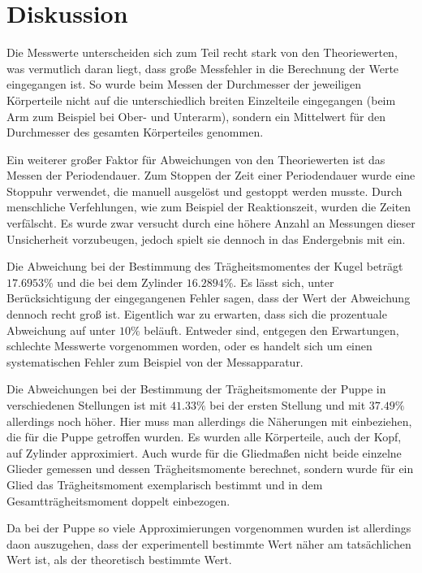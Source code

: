 \newpage
\section{Diskussion}
\label{sec:Diskussion}


Die Messwerte unterscheiden sich zum Teil recht stark von den Theoriewerten, was vermutlich daran liegt, dass große Messfehler
in die Berechnung der Werte eingegangen ist. So wurde beim Messen der Durchmesser der jeweiligen Körperteile nicht auf die unterschiedlich
breiten Einzelteile eingegangen (beim Arm zum Beispiel bei Ober- und Unterarm), sondern ein Mittelwert für den Durchmesser des gesamten
Körperteiles genommen.

Ein weiterer großer Faktor für Abweichungen von den Theoriewerten ist das Messen der Periodendauer. Zum Stoppen der Zeit einer 
Periodendauer wurde eine Stoppuhr verwendet, die manuell ausgelöst und gestoppt werden musste. Durch menschliche Verfehlungen, wie zum Beispiel
der Reaktionszeit, wurden die Zeiten verfälscht. Es wurde zwar versucht durch eine höhere Anzahl an Messungen dieser Unsicherheit vorzubeugen, jedoch
spielt sie dennoch in das Endergebnis mit ein. 

Die Abweichung bei der Bestimmung des Trägheitsmomentes der Kugel beträgt $17.6953 \%$ und die bei dem Zylinder $16.2894 \%$. Es lässt sich,
unter Berücksichtigung der eingegangenen Fehler sagen, dass der Wert der Abweichung dennoch recht groß ist. Eigentlich war zu erwarten, dass sich die
prozentuale Abweichung auf unter $10 \%$ beläuft. Entweder sind, entgegen den Erwartungen, schlechte Messwerte vorgenommen worden, oder es handelt
sich um einen systematischen Fehler zum Beispiel von der Messapparatur.

Die Abweichungen bei der Bestimmung der Trägheitsmomente der Puppe in verschiedenen Stellungen ist mit $41.33 \%$ bei der ersten Stellung und mit
$37.49 \%$ allerdings noch höher. Hier muss man allerdings die Näherungen mit einbeziehen, die für die Puppe getroffen wurden. Es wurden alle
Körperteile, auch der Kopf, auf Zylinder approximiert. Auch wurde für die Gliedmaßen nicht beide einzelne Glieder gemessen und dessen Trägheitsmomente
berechnet, sondern wurde für ein Glied das Trägheitsmoment exemplarisch bestimmt und in dem Gesamtträgheitsmoment doppelt einbezogen.

Da bei der Puppe so viele Approximierungen vorgenommen wurden ist allerdings daon auszugehen, dass der experimentell bestimmte Wert näher am 
tatsächlichen Wert ist, als der theoretisch bestimmte Wert.
